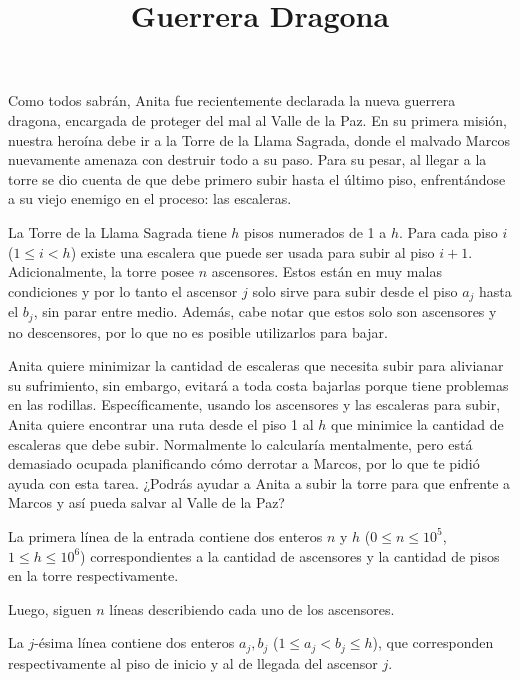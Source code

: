 \documentclass{oci}
\title{Guerrera Dragona}
\begin{document}
\begin{problemDescription}
  Como todos sabrán, Anita fue recientemente
  declarada la nueva guerrera dragona, encargada
  de proteger del mal al Valle de la Paz.
  En su primera misión, nuestra heroína debe ir
  a la Torre de la Llama Sagrada, donde
  el malvado Marcos nuevamente amenaza con
  destruir todo a su paso.
  Para su pesar, al llegar a la torre se dio cuenta
  de que debe primero subir hasta el último piso,
  enfrentándose a su viejo enemigo en el proceso: las escaleras.


  La Torre de la Llama Sagrada tiene $h$ pisos numerados
  de 1 a $h$.
  Para cada piso $i$ ($1 \leq i < h$) existe una escalera que
  puede ser usada para subir al piso $i+1$.
  Adicionalmente, la torre posee $n$ ascensores.
  Estos están en muy malas condiciones y por lo tanto el
  ascensor $j$ solo sirve para subir desde el piso $a_j$ hasta el
  $b_j$, sin parar entre medio.
  Además, cabe notar que estos solo son ascensores y no descensores,
  por lo que no es posible utilizarlos para bajar.

  Anita quiere minimizar la cantidad de escaleras que
  necesita subir para alivianar su sufrimiento, sin embargo,
  evitará a toda costa bajarlas porque tiene
  problemas en las rodillas.
  Específicamente, usando los ascensores y las escaleras para subir,
  Anita quiere encontrar una ruta desde el piso 1 al $h$ que
  minimice la cantidad de escaleras que debe subir.
  Normalmente lo calcularía mentalmente, pero está demasiado
  ocupada planificando cómo derrotar a Marcos, por lo que
  te pidió ayuda con esta tarea.
  ¿Podrás ayudar a Anita a subir la torre para
  que enfrente a Marcos y así pueda salvar al Valle de
  la Paz?
\end{problemDescription}

\begin{inputDescription}
  La primera línea de la entrada contiene dos enteros
  $n$ y $h$ ($0 \leq n \leq 10^5$, $1 \leq h \leq 10^6$)
  correspondientes a la cantidad de ascensores y la cantidad
  de pisos en la torre respectivamente.

  Luego, siguen $n$ líneas describiendo cada uno de los ascensores.

  La $j$-ésima línea contiene dos enteros $a_j, b_j$
  ($1 \leq a_j < b_j \leq h$), que corresponden respectivamente
  al piso de inicio y al de llegada del ascensor $j$.
\end{inputDescription}
\end{document}
